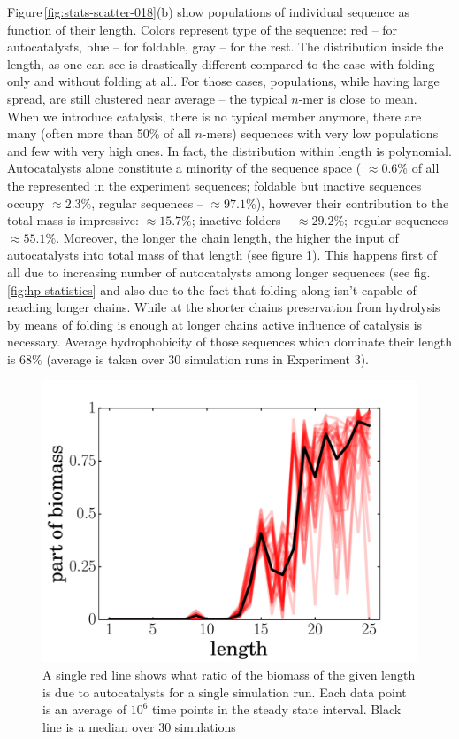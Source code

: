 \documentclass[5p,times]{elsarticle}
\begin{document}
Figure\,\ref{fig:stats-scatter-018}(b) show populations of individual sequence as function of 
their 
length. Colors represent type of the sequence: red -- for autocatalysts, blue -- for foldable, 
gray 
-- for the rest. The distribution inside the length, as one can see is drastically different 
compared to the case with folding only and without folding at all. For those cases, populations, 
while having large spread, 
are still clustered near average -- the typical $n$-mer is close to mean. When we introduce 
catalysis, 
there is no typical member anymore, there are many (often more than  50\% of all $n$-mers) 
sequences with very low populations and few with very high ones. In fact, the distribution within 
length is polynomial. Autocatalysts alone constitute a minority of the sequence space ( 
$\approx 
0.6\%$ 
of all the represented in the experiment sequences; foldable but inactive sequences occupy 
$\approx 
2.3\%$, regular sequences -- $\approx97.1\%$), however their contribution to the total mass is 
impressive: 
$\approx 15.7\%$; inactive folders -- $\approx 29.2\%;$ regular sequences $\approx 55.1\%$. 
Moreover, the longer the chain length, the higher the input of autocatalysts into total mass of 
that length (see figure \ref{fig:biomass}). This happens first of all due to increasing number of 
autocatalysts among longer sequences (see fig.\ref{fig:hp-statistics} and also due to the fact 
that 
folding along isn't capable of reaching longer chains. While at the shorter chains preservation 
from hydrolysis by means of folding is enough at longer chains active influence of catalysis is 
necessary. Average hydrophobicity of those sequences which dominate their length is $68\%$ (average 
is taken over 30 simulation runs in Experiment 3).
\begin{figure}[h!]
  \centering
  \includegraphics[width=0.9\columnwidth]{pictures/biomass.pdf} 
  \caption{\footnotesize{A single red line shows what ratio of the biomass of the 
given length is due to autocatalysts for a single simulation run. Each data point is an average of 
$10^6$ time points in the steady state interval. Black line is a median over 30 simulations }}
  \label{fig:biomass}
\end{figure}
\end{document}
